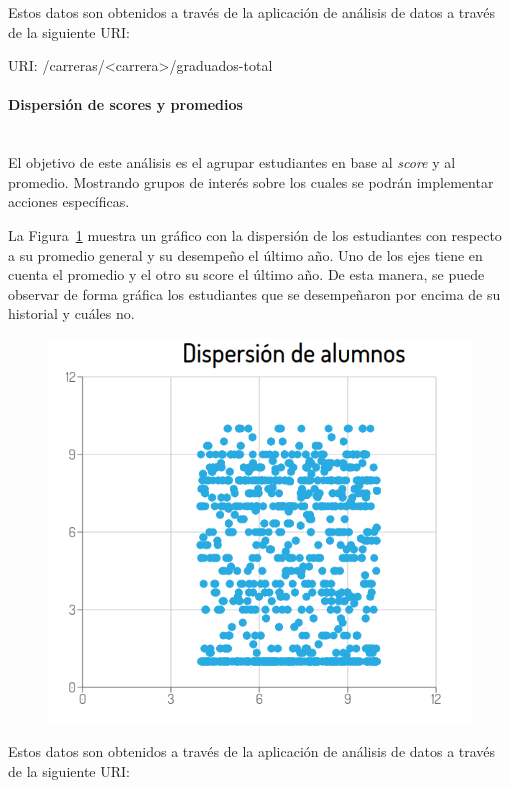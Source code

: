 Estos datos son obtenidos a través de la aplicación de análisis de datos a través de la siguiente URI:

URI: /carreras/<carrera>/graduados-total \\

\paragraph{Dispersión de scores y promedios}\mbox{}\\
El objetivo de este análisis es el agrupar estudiantes en base al \textit{score} y al promedio. Mostrando grupos de interés sobre los cuales se podrán implementar acciones específicas.

La Figura~\ref{fig:sa-dispersion} muestra un gráfico con la dispersión de los estudiantes con respecto a su promedio general y su desempeño el último año. Uno de los ejes tiene en cuenta el promedio y el otro su score el último año. De esta manera, se puede observar de forma gráfica los estudiantes que se desempeñaron por encima de su historial y cuáles no.

\begin{figure}[H]
  \centering
    \includegraphics[scale=0.4]{images/seguimiento-academico/sa-dispersion.png}
  \label{fig:sa-dispersion}
\end{figure}

Estos datos son obtenidos a través de la aplicación de análisis de datos a través de la siguiente URI:

